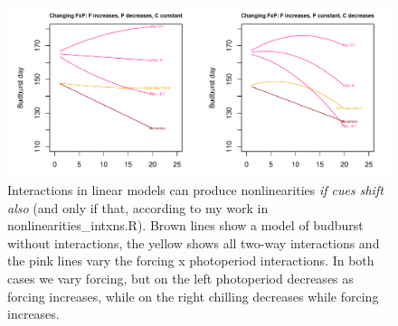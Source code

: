 \documentclass[11pt,letter]{article}
\begin{document}
\begin{figure}[t!]
\centering
\includegraphics[width=1\textwidth]{..//..//analyses/limitingcues/figures/intxnsims_FPexample.pdf}
\caption{Interactions in linear models can produce nonlinearities \emph{if cues shift also} (and only if that, according to my work in nonlinearities\_intxns.R). Brown lines show a model of budburst without interactions, the yellow shows all two-way interactions and the pink lines vary the forcing x photoperiod interactions. In both cases we vary forcing, but on the left photoperiod decreases as forcing increases, while on the right chilling decreases while forcing increases.} %
  \label{fig:intxns}
\end{figure}
\clearpage
\end{document}

